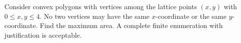 Consider convex polygons with vertices among the lattice points $(x,y)$ with $0\le x,y\le4$. No two vertices may have the same $x$-coordinate or the same $y$-coordinate. Find the maximum area. A complete finite enumeration with justification is acceptable.

